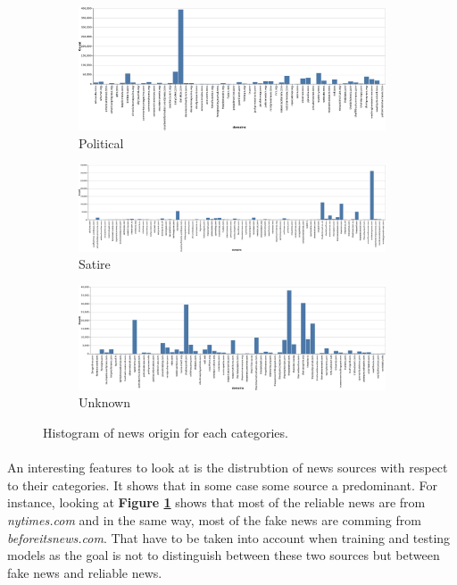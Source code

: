 \begin{figure}\ContinuedFloat
    \begin{subfigure}[b]{1\textwidth}
         \centering
         \includegraphics[width=\textwidth]{chapter/images/data_exploration/political.eps}
         \caption{Political}
     \end{subfigure}
     \vfill
     \begin{subfigure}[b]{1\textwidth}
         \centering
         \includegraphics[width=\textwidth]{chapter/images/data_exploration/satire.eps}
         \caption{Satire}
     \end{subfigure}
     \vfill
     \begin{subfigure}[b]{1\textwidth}
         \centering
         \includegraphics[width=\textwidth]{chapter/images/data_exploration/unknown.eps}
         \caption{Unknown}
     \end{subfigure}
        \caption{Histogram of news origin for each categories.}
        \label{fig:data_explo:source}
\end{figure}

\paragraph{} An interesting features to look at is the distrubtion of news sources with respect to their categories. It shows that in some case some source a predominant. For instance, looking at \textbf{Figure \ref{fig:data_explo:source}} shows that most of the reliable news are from \textit{nytimes.com} and in the same way, most of the fake news are comming from \textit{beforeitsnews.com}. That have to be taken into account when training and testing models as the goal is not to distinguish between these two sources but between fake news and reliable news. 

